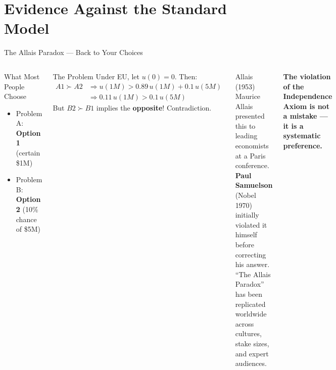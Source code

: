 \documentclass[aspectratio=169]{beamer}
\begin{document}
\section{Evidence Against the Standard Model}

\begin{frame}{The Allais Paradox --- Back to Your Choices}
\begin{columns}
\begin{block}{What Most People Choose}
\begin{itemize}
  \item Problem A: \textbf{Option 1} (certain \$1M)
  \item Problem B: \textbf{Option 2} (10\% chance of \$5M)
\end{itemize}
\end{block}
\begin{alertblock}{The Problem}
Under EU, let $u(0)=0$. Then:
\begin{align*}
A1 \succ A2 &\Rightarrow u(1M) > 0.89\,u(1M) + 0.1\,u(5M)\\
&\Rightarrow 0.11\,u(1M) > 0.1\,u(5M)
\end{align*}
But $B2 \succ B1$ implies the \textbf{opposite}! \alert{Contradiction.}
\end{alertblock}
\begin{exampleblock}{Allais (1953)}
Maurice Allais presented this to leading economists at a Paris conference. \textbf{Paul Samuelson} (Nobel 1970) initially violated it himself before correcting his answer. ``The Allais Paradox'' has been replicated worldwide across cultures, stake sizes, and expert audiences.
\end{exampleblock}
\vspace{0.5em}
\textcolor{bepurple}{\textbf{The violation of the Independence Axiom is not a mistake --- it is a systematic preference.}}
\end{columns}
\end{frame}
\end{document}
